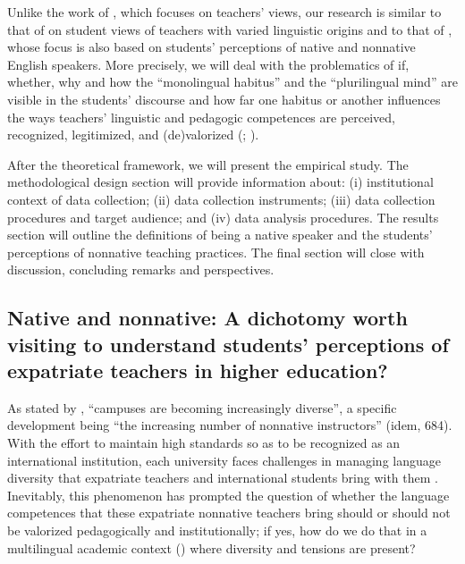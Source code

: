 \documentclass[output=paper]{../langscibook}
\begin{document}
Unlike the work of \citet{Medgyes1992,Medgyes1994}, which focuses on teachers’ views, our research is similar to that of \citet{LiChuaChenVanTienNguyen2011} on student views of teachers with varied linguistic origins and to that of \citet{LasagabasterSierra2002}, whose focus is also based on students’ perceptions of native and nonnative English speakers. More precisely, we will deal with the problematics of if, whether, why and how the “monolingual habitus” \citep{Gogolin2008} and the “plurilingual mind” \citep{Menghini2017} are visible in the students’ discourse and how far one habitus or another influences the ways teachers’ linguistic and pedagogic competences are perceived, recognized, legitimized, and (de)valorized (\citealt{Kramsch1997}; \citealt{ClarkParan2007}).

After the theoretical framework, we will present the empirical study. The methodological design section will provide information about: (i) institutional context of data collection; (ii) data collection instruments; (iii) data collection procedures and target audience; and (iv) data analysis procedures. The results section will outline the definitions of being a native speaker and the students’ perceptions of nonnative teaching practices. The final section will close with discussion, concluding remarks and perspectives.

\subsection{Native and nonnative: A dichotomy worth visiting to understand students’ perceptions of expatriate teachers in higher education?}

As stated by \citet[683]{KangEtAl2015}, “campuses are becoming increasingly diverse”, a specific development being “the increasing number of nonnative instructors” (idem, 684). With the effort to maintain high standards so as to be recognized as an international institution, each university faces challenges in managing language diversity that expatriate teachers and international students bring with them \citep{Yanaprasart2018}. Inevitably, this phenomenon has prompted the question of whether the language competences that these expatriate nonnative teachers bring should or should not be valorized pedagogically and institutionally; if yes, how do we do that in a multilingual academic context (\citealt{BlommaertVerschueren1998}) where diversity and tensions are present?
\end{document}
